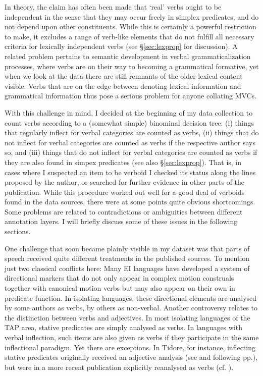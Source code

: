 In theory, the claim has often been made that `real' verbs ought to be independent in the sense that they may occur freely in simplex predicates, and do not depend upon other constituents. While this is certainly a powerful restriction to make, it excludes a range of verb-like elements that do not fulfill all necessary criteria for lexically independent verbs (see §\ref{sec:lexprop} for discussion). A related problem pertains to semantic development in verbal grammaticalization processes, where verbs are on their way to becoming a grammatical formative, yet when we look at the data there are still remnants of the older lexical content visible. Verbs that are on the edge between denoting lexical information and grammatical information thus pose a serious problem for anyone collating MVCs.

With this challenge in mind, I decided at the beginning of my data collection to count verbs according to a (somewhat simple) binominal decision tree: (i) things that regularly inflect for verbal categories are counted as verbs, (ii) things that do not inflect for verbal categories are counted as verbs if the respective author says so, and (iii) things that do not inflect for verbal categories are counted as verbs if they are also found in simpex predicates (see also §\ref{sec:lexprop}). That is, in cases where I suspected an item to be verboid I checked its status along the lines proposed by the author, or searched for further evidence in other parts of the publication. While this procedure worked out well for a good deal of verboids found in the data sources, there were at some points quite obvious shortcomings. Some problems are related to contradictions or ambiguities between different annotation layers. I will briefly discuss some of these issues in the following sections.

One challenge that soon became plainly visible in my dataset was that parts of speech received quite different treatments in the published sources. To mention just two classical conflicts here: Many EI languages have developed a system of directional markers that do not only appear in complex motion construals together with canonical motion verbs but may also appear on their own in predicate function. In isolating languages, these directional elements are analysed by some authors as verbs, by others as non-verbal. Another controversy relates to the distinction between verbs and adjectives. In most isolating languages of the TAP area, stative predicates are simply analysed as verbs. In languages with verbal inflection, such items are also given as verbs if they participate in the same inflectional paradigm. Yet there are exceptions. In Tidore, for instance, inflecting stative predicates originally received an adjective analysis (see \citealt[81]{vanstaden2000tidore} and following pp.), but were in a more recent publication explicitly reanalysed as verbs (cf. \citealt[46]{vanstaden2008serial}). 

